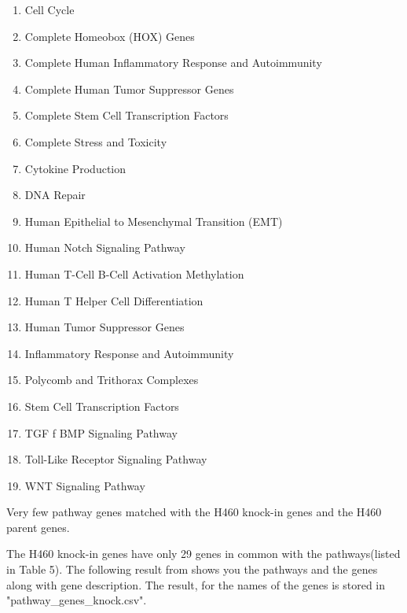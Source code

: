 \documentclass[11pt]{article}
\begin{document}
\begin{enumerate}[itemsep=-0.2mm]
\item Cell Cycle                                 
\item Complete Homeobox (HOX) Genes                      
\item Complete Human Inflammatory Response and Autoimmunity 
\item Complete Human Tumor Suppressor Genes              
\item Complete Stem Cell Transcription Factors            
\item Complete Stress and Toxicity                         
\item Cytokine Production                                
\item DNA Repair 
\item Human Epithelial to Mesenchymal Transition (EMT)    
\item Human Notch Signaling Pathway                      
\item Human T-Cell B-Cell Activation Methylation         
\item Human T Helper Cell Differentiation                
\item Human Tumor Suppressor Genes                        
\item Inflammatory Response and Autoimmunity               
\item Polycomb and Trithorax Complexes                     
\item Stem Cell Transcription Factors                    
\item TGF f BMP Signaling Pathway                          
\item Toll-Like Receptor Signaling Pathway               
\item WNT Signaling Pathway                              
\end{enumerate}

Very few pathway genes matched with the H460 knock-in genes and the H460 parent genes. 

The H460 knock-in genes have only 29 genes in common with the pathways(listed in Table 5). The following result from shows you the pathways and the genes along with gene description. The result, for the names of the genes is stored in "pathway\_genes\_knock.csv". 

\newpage

\end{document}
